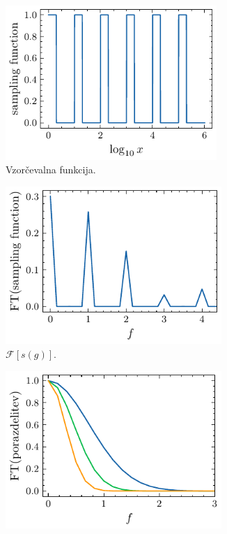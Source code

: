 \documentclass[11pt, oneside]{article}
\theoremstyle{definition}
\begin{document}
\begin{figure}[h!]
    \centering
    \begin{subfigure}[b]{0.49\textwidth}
        \centering
        \includegraphics[width=0.88\textwidth]{lognorm_sampling_function.pdf}
        \caption{Vzorčevalna funkcija.}
        \label{fig: sf}
    \end{subfigure}
    \hfill
    \begin{subfigure}[b]{0.49\textwidth}
        \centering
        \includegraphics[width=0.9\textwidth]{lognorm_FT_sampling_function.pdf}
        \caption{$\mathcal{F}[s(g)]$.}
    \end{subfigure}
    \hfill
    \begin{subfigure}[b]{0.49\textwidth}
        \centering
        \includegraphics[width=0.9\textwidth]{lognorm_FT_pdf.pdf}

\end{subfigure}
\end{figure}
\end{document}
